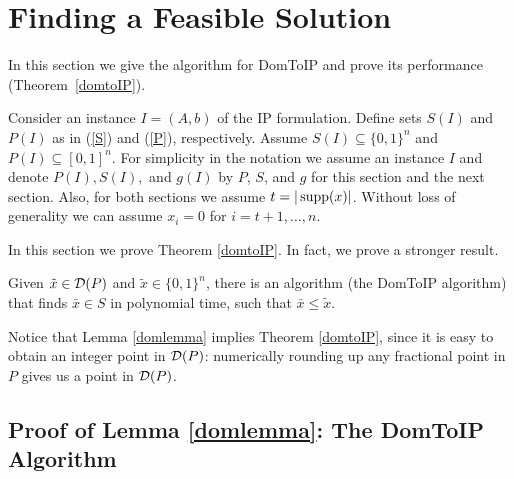 \section{Finding a Feasible Solution}\label{sec:domTOIP}
In this section we give the algorithm for DomToIP and prove its performance (Theorem~\ref{domtoIP}).

Consider an instance $I=(A,b)$ of the IP formulation. Define sets $S(I)$ and $P(I)$ as in (\ref{S}) and (\ref{P}), respectively. Assume $S(I)\subseteq \{0,1\}^n$ and $P(I)\subseteq [0,1]^n$. For simplicity in the notation we assume an instance $I$ and denote $P(I),S(I),$ and $g(I)$ by $P$, $S$, and $g$ for this section and the next section. Also, for both sections we assume $t=|\operatorname{supp}(x)|$. Without loss of generality we can assume $x_i = 0$ for $i=t+1,\ldots,n$.

In this section we prove Theorem \ref{domtoIP}. In fact, we prove a stronger result. 
\begin{lemma}\label{domlemma}
	Given $\tilde{x}\in \operatorname{\mathcal{D}}(P)$ and $\tilde{x}\in \{0,1\}^n$, there is an algorithm (the DomToIP algorithm) that finds $\bar{x}\in S$ in polynomial time, such that $\bar{x}\leq \tilde{x}$.\end{lemma}
Notice that Lemma \ref{domlemma} implies Theorem \ref{domtoIP}, since it is easy to obtain an integer point in $\operatorname{\mathcal{D}}(P)$: numerically rounding up any fractional point in $P$ gives us a point in $\operatorname{\mathcal{D}}(P)$.

\subsection{Proof of Lemma \ref{domlemma}: The DomToIP Algorithm}

